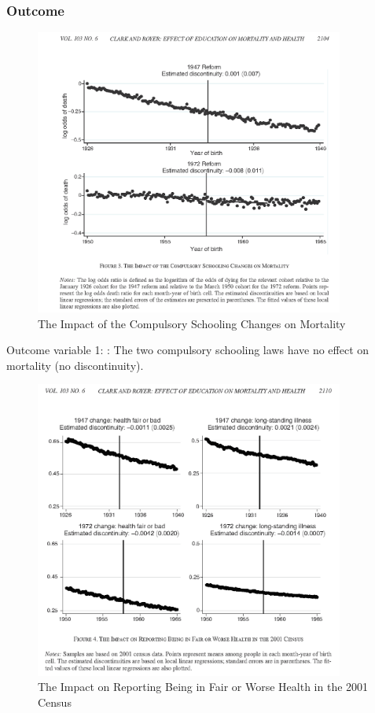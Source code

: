         \subsubsection{Outcome}
            \begin{figure}[H]
                \centering
                \includegraphics[width=4in]{images/ch3/37.png}
                \caption{The Impact of the Compulsory Schooling Changes on Mortality}
            \end{figure}

            Outcome variable 1: : The two compulsory schooling laws have no effect on mortality (no discontinuity).
     
            \begin{figure}[H]
                \centering
                \includegraphics[width=4in]{images/ch3/38.png}
                \caption{The Impact on Reporting Being in Fair or Worse Health in the 2001 Census}
            \end{figure}  
            
